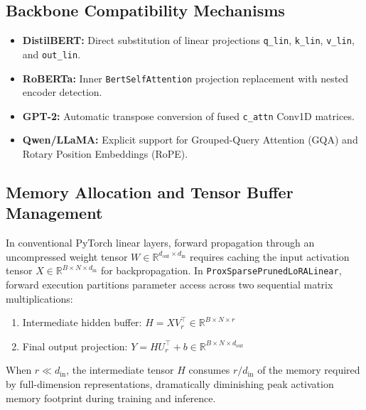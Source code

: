 \subsection{Backbone Compatibility Mechanisms}
\begin{itemize}
\item \textbf{DistilBERT:} Direct substitution of linear projections \texttt{q\_lin}, \texttt{k\_lin}, \texttt{v\_lin}, and \texttt{out\_lin}.
\item \textbf{RoBERTa:} Inner \texttt{BertSelfAttention} projection replacement with nested encoder detection.
\item \textbf{GPT-2:} Automatic transpose conversion of fused \texttt{c\_attn} Conv1D matrices.
\item \textbf{Qwen/LLaMA:} Explicit support for Grouped-Query Attention (GQA) and Rotary Position Embeddings (RoPE).
\end{itemize}

\subsection{Memory Allocation and Tensor Buffer Management}
In conventional PyTorch linear layers, forward propagation through an uncompressed weight tensor $W \in \mathbb{R}^{d_{\text{out}} \times d_{\text{in}}}$ requires caching the input activation tensor $X \in \mathbb{R}^{B \times N \times d_{\text{in}}}$ for backpropagation. In \texttt{ProxSparsePrunedLoRALinear}, forward execution partitions parameter access across two sequential matrix multiplications:
\begin{enumerate}
\item Intermediate hidden buffer: $H = X V_r^\top \in \mathbb{R}^{B \times N \times r}$
\item Final output projection: $Y = H U_r^\top + b \in \mathbb{R}^{B \times N \times d_{\text{out}}}$
\end{enumerate}
When $r \ll d_{\text{in}}$, the intermediate tensor $H$ consumes $r / d_{\text{in}}$ of the memory required by full-dimension representations, dramatically diminishing peak activation memory footprint during training and inference.


